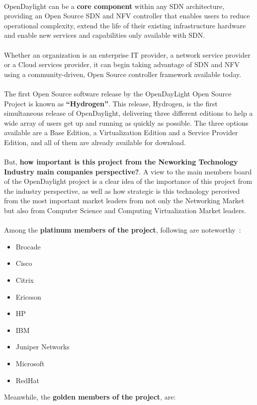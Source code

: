 \documentclass[a4paper, 12pt]{book}
\begin{document}
\\
OpenDaylight can be a \textbf{core component} within any SDN architecture, providing an Open Source SDN and NFV controller that enables users to reduce operational complexity, extend the life of their existing infrastructure hardware and enable new services and capabilities only available with SDN.\\
\\
Whether an organization is an enterprise IT provider, a network service provider or a Cloud services provider, it can begin taking advantage of SDN and NFV using a community-driven, Open Source controller framework available today.\\
\\
The first Open Source software release by the OpenDayLight Open Source Project is known as \textbf{``Hydrogen''}. This release, Hydrogen, is the first simultaneous release of OpenDaylight, delivering three different editions to help a wide array of users get up and running as quickly as possible. The three options available are a Base Edition, a Virtualization Edition and a Service Provider Edition, and all of them are already available for download.\\
\\
But, \textbf{how important is this project from the Neworking Technology Industry main companies perspective?}. A view to the main members board of the OpenDaylight project is a clear idea of the importance of this project from the industry perspective, as well as how strategic is this technology perceived from the most important market leaders from not only the Networking Market but also from Computer Science and Computing Virtualization Market leaders.\\
\\
Among the \textbf{platinum members of the project}, following are noteworthy~\cite{OpenDaylightMembers}:
 \begin{itemize}\itemsep0pt
  \item Brocade
  \item Cisco
  \item Citrix
  \item Ericsson
  \item HP
  \item IBM
  \item Juniper Networks
  \item Microsoft
  \item RedHat
 \end{itemize}
Meanwhile, the \textbf{golden members of the project}, are:
\end{document}
